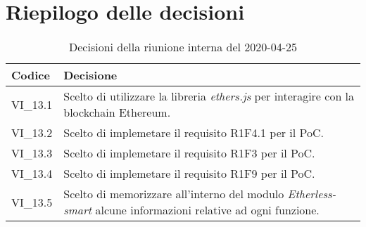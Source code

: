\section{Riepilogo delle decisioni}
\begin{longtable}{ 
	 >{\centering}p{} >{}p{} }
	
	\caption{Decisioni della riunione interna del 2020-04-25}\\	
	
	\textbf{\color{white}Codice} & 
	\textbf{\color{white}Decisione} 
	\tabularnewline  
	\endhead
	
	VI\_13.1 & Scelto di utilizzare la libreria \textit{ethers.js} per interagire con la blockchain\ped{\textit{G}} Ethereum\ped{\textit{G}}. \\
	VI\_13.2 & Scelto di implemetare il requisito R1F4.1 per il PoC. \\
	VI\_13.3 & Scelto di implemetare il requisito R1F3 per il PoC. \\
	VI\_13.4 & Scelto di implemetare il requisito R1F9 per il PoC. \\	
	VI\_13.5 & Scelto di memorizzare all'interno del modulo \textit{Etherless-smart} alcune informazioni relative ad ogni funzione. \\
	

\end{longtable}